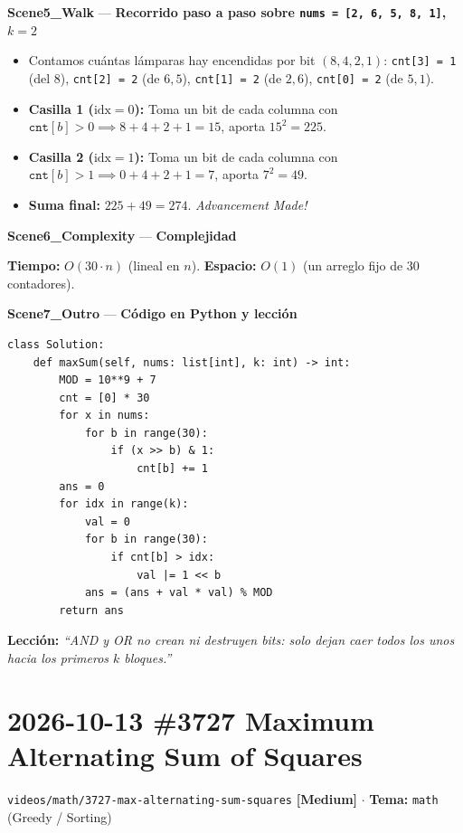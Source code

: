 \documentclass[letterpaper,10pt]{article}
\newcommand{\scene}[2]{\noindent\textbf{\textcolor{mcaqua}{#1}} --- \textbf{#2}\par\vspace{1pt}}
\newcommand{\folder}[1]{\texttt{\textcolor{mcgreen}{#1}}}
\newcommand{\badge}[2]{\textbf{\textcolor{#1}{[#2]}}}
\begin{document}
\begin{shaded}
\scene{Scene5\_Walk}{Recorrido paso a paso sobre \texttt{nums = [2, 6, 5, 8, 1]}, $k = 2$}
\begin{itemize}\setlength{\itemsep}{1pt}
  \item Contamos cu\'antas l\'amparas hay encendidas por bit $(8, 4, 2, 1)$:
        \texttt{cnt[3] = 1} (del $8$), \texttt{cnt[2] = 2} (de $6, 5$), \texttt{cnt[1] = 2} (de $2, 6$), \texttt{cnt[0] = 2} (de $5, 1$).
  \item \textbf{Casilla 1 ($\text{idx} = 0$):} Toma un bit de cada columna con $\texttt{cnt}[b] > 0 \implies 8 + 4 + 2 + 1 = 15$, aporta $15^2 = 225$.
  \item \textbf{Casilla 2 ($\text{idx} = 1$):} Toma un bit de cada columna con $\texttt{cnt}[b] > 1 \implies 0 + 4 + 2 + 1 = 7$, aporta $7^2 = 49$.
  \item \textbf{Suma final:} $225 + 49 = 274$. \textit{Advancement Made!}
\end{itemize}

\scene{Scene6\_Complexity}{Complejidad}
\textbf{Tiempo:} $O(30 \cdot n)$ (lineal en $n$). \quad \textbf{Espacio:} $O(1)$ (un arreglo fijo de $30$ contadores).
\end{shaded}

\scene{Scene7\_Outro}{C\'odigo en Python y lecci\'on}
\begin{Verbatim}[frame=single,fontsize=\small]
class Solution:
    def maxSum(self, nums: list[int], k: int) -> int:
        MOD = 10**9 + 7
        cnt = [0] * 30
        for x in nums:
            for b in range(30):
                if (x >> b) & 1:
                    cnt[b] += 1
        ans = 0
        for idx in range(k):
            val = 0
            for b in range(30):
                if cnt[b] > idx:
                    val |= 1 << b
            ans = (ans + val * val) % MOD
        return ans
\end{Verbatim}
\textbf{Lecci\'on:} \textit{``AND y OR no crean ni destruyen bits: solo dejan caer todos los unos hacia los primeros $k$ bloques.''}

\newpage

\section{2026-10-13 \textbar{} \#3727 Maximum Alternating Sum of Squares}
\folder{videos/math/3727-max-alternating-sum-squares} \hfill \badge{mcgold}{Medium} $\cdot$ \textbf{Tema:} \texttt{math} (Greedy / Sorting)
\end{document}
